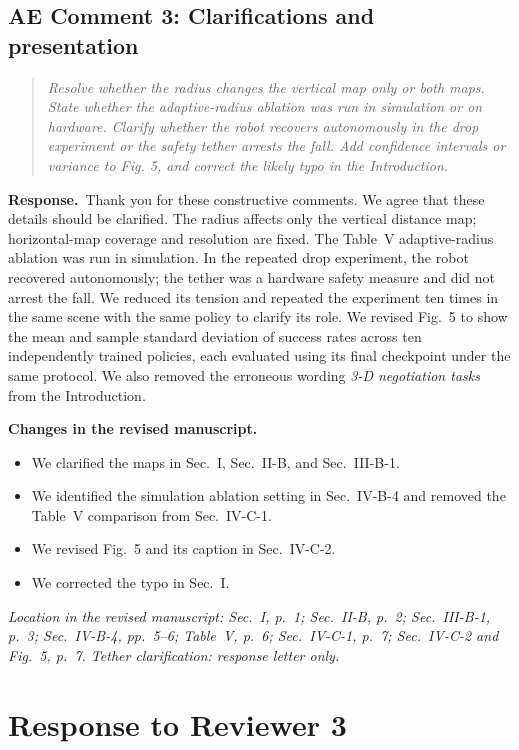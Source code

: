 \documentclass[11pt]{article}
\newenvironment{reviewcomment}{\begin{quote}\color{reviewblue}\itshape}{\end{quote}}
\newcommand{\Response}{\par\noindent\textbf{Response.}\ }
\newcommand{\Changes}{\par\noindent\textbf{Changes in the revised manuscript.}\ }
\newcommand{\Location}[1]{\par\noindent\textit{Location in the revised manuscript: #1}}
\begin{document}
\subsection*{AE Comment 3: Clarifications and presentation}
\begin{reviewcomment}
Resolve whether the radius changes the vertical map only or both maps. State whether the adaptive-radius ablation was run in simulation or on hardware. Clarify whether the robot recovers autonomously in the drop experiment or the safety tether arrests the fall. Add confidence intervals or variance to Fig. 5, and correct the likely typo in the Introduction.
\end{reviewcomment}
\Response Thank you for these constructive comments. We agree that these details should be clarified. The radius affects only the vertical distance map; horizontal-map coverage and resolution are fixed. The Table~V adaptive-radius ablation was run in simulation. In the repeated drop experiment, the robot recovered autonomously; the tether was a hardware safety measure and did not arrest the fall. We reduced its tension and repeated the experiment ten times in the same scene with the same policy to clarify its role. We revised Fig.~5 to show the mean and sample standard deviation of success rates across ten independently trained policies, each evaluated using its final checkpoint under the same protocol. We also removed the erroneous wording \textit{3-D negotiation tasks} from the Introduction.
\Changes
\begin{itemize}
    \item We clarified the maps in Sec.~I, Sec.~II-B, and Sec.~III-B-1.
    \item We identified the simulation ablation setting in Sec.~IV-B-4 and removed the Table~V comparison from Sec.~IV-C-1.
    \item We revised Fig.~5 and its caption in Sec.~IV-C-2.
    \item We corrected the typo in Sec.~I.
\end{itemize}


\Location{Sec.~I, p.~1; Sec.~II-B, p.~2; Sec.~III-B-1, p.~3; Sec.~IV-B-4, pp.~5--6; Table~V, p.~6; Sec.~IV-C-1, p.~7; Sec.~IV-C-2 and Fig.~5, p.~7. Tether clarification: response letter only.}

\clearpage
\section*{Response to Reviewer 3}
\end{document}
